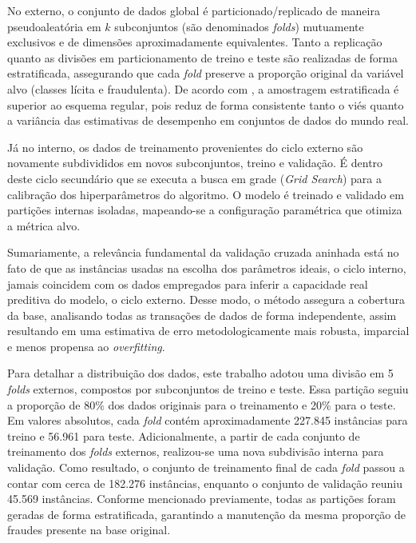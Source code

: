 \documentclass{uflamon}          %
\begin{document}
No externo, o conjunto de dados global é particionado/replicado de maneira pseudoaleatória em $k$ subconjuntos (são denominados \textit{folds}) mutuamente exclusivos e de dimensões aproximadamente equivalentes. Tanto a replicação quanto as divisões em particionamento de treino e teste são realizadas de forma estratificada, assegurando que cada \textit{fold} preserve a proporção original da variável alvo (classes lícita e fraudulenta). De acordo com , a amostragem estratificada é superior ao esquema regular, pois reduz de forma consistente tanto o viés quanto a variância das estimativas de desempenho em conjuntos de dados do mundo real.

Já no interno, os dados de treinamento provenientes do ciclo externo são novamente subdivididos em novos subconjuntos, treino e validação. É dentro deste ciclo secundário que se executa a busca em grade (\textit{Grid Search}) para a calibração dos hiperparâmetros do algoritmo. O modelo é treinado e validado em partições internas isoladas, mapeando-se a configuração paramétrica que otimiza a métrica alvo.

Sumariamente, a relevância fundamental da validação cruzada aninhada está no fato de que as instâncias usadas na escolha dos parâmetros ideais, o ciclo interno, jamais coincidem com os dados empregados para inferir a capacidade real preditiva do modelo, o ciclo externo. Desse modo, o método assegura a cobertura da base, analisando todas as transações de dados de forma independente, assim resultando em uma estimativa de erro metodologicamente mais robusta, imparcial e menos propensa ao \textit{overfitting}.

Para detalhar a distribuição dos dados, este trabalho adotou uma divisão em 5 \textit{folds} externos, compostos por subconjuntos de treino e teste. Essa partição seguiu a proporção de 80\% dos dados originais para o treinamento e 20\% para o teste. Em valores absolutos, cada \textit{fold} contém aproximadamente 227.845 instâncias para treino e 56.961 para teste. Adicionalmente, a partir de cada conjunto de treinamento dos \textit{folds} externos, realizou-se uma nova subdivisão interna para validação. Como resultado, o conjunto de treinamento final de cada \textit{fold} passou a contar com cerca de 182.276 instâncias, enquanto o conjunto de validação reuniu 45.569 instâncias. Conforme mencionado previamente, todas as partições foram geradas de forma estratificada, garantindo a manutenção da mesma proporção de fraudes presente na base original.
\end{document}

